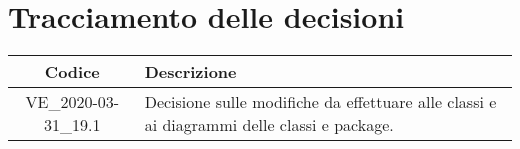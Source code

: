 \section*{Tracciamento delle decisioni}

\begin{center}
	\begin{longtable}{|c|p{12.25cm}|}
	\hline
	\rowcolor{lighter-grayer}
	\textbf{Codice} & \textbf{Descrizione} \\
	\hline
	\endfirsthead

	\hline
	VE\_2020-03-31\_19.1 & Decisione sulle modifiche da effettuare alle classi e ai diagrammi delle classi e package. \\
	\hline

	\end{longtable}
\end{center}
